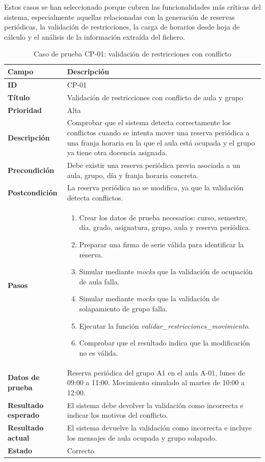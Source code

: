 Estos casos se han seleccionado porque cubren las funcionalidades más críticas del sistema, especialmente aquellas relacionadas con la generación de reservas periódicas, la validación de restricciones, la carga de horarios desde hoja de cálculo y el análisis de la información extraída del fichero.

\begin{table}[H]
	\centering
	\small
	\renewcommand{\arraystretch}{1.2}
	\begin{tabularx}{\textwidth}{@{}p{3.5cm}X@{}}
		\toprule
		\textbf{Campo} & \textbf{Descripción} \\
		\midrule
		\textbf{ID} & CP-01 \\
		\textbf{Título} & Validación de restricciones con conflicto de aula y grupo \\
		\textbf{Prioridad} & Alta \\
		\textbf{Descripción} & Comprobar que el sistema detecta correctamente los conflictos cuando se intenta mover una reserva periódica a una franja horaria en la que el aula está ocupada y el grupo ya tiene otra docencia asignada. \\
		\textbf{Precondición} & Debe existir una reserva periódica previa asociada a un aula, grupo, día y franja horaria concreta. \\
		\textbf{Postcondición} & La reserva periódica no se modifica, ya que la validación detecta conflictos. \\
		\textbf{Pasos} &
		\begin{enumerate}
			\item Crear los datos de prueba necesarios: curso, semestre, día, grado, asignatura, grupo, aula y reserva periódica.
			\item Preparar una firma de serie válida para identificar la reserva.
			\item Simular mediante \textit{mocks} que la validación de ocupación de aula falla.
			\item Simular mediante \textit{mocks} que la validación de solapamiento de grupo falla.
			\item Ejecutar la función \textit{validar\_restricciones\_movimiento}.
			\item Comprobar que el resultado indica que la modificación no es válida.
		\end{enumerate} \\
		\textbf{Datos de prueba} & Reserva periódica del grupo A1 en el aula A-01, lunes de 09:00 a 11:00. Movimiento simulado al martes de 10:00 a 12:00. \\
		\textbf{Resultado esperado} & El sistema debe devolver la validación como incorrecta e indicar los motivos del conflicto. \\
		\textbf{Resultado actual} & El sistema devuelve la validación como incorrecta e incluye los mensajes de aula ocupada y grupo solapado. \\
		\textbf{Estado} & Correcto \\
		\bottomrule
	\end{tabularx}
	\caption{Caso de prueba CP-01: validación de restricciones con conflicto}
	\label{tab}
\end{table}

